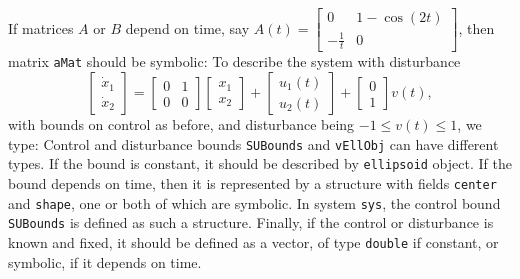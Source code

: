 If matrices $A$ or $B$ depend on time, say $A(t)=\left[\begin{array}{cc}
0 & 1-\cos(2t)\\
-\frac{1}{t} & 0\end{array}\right]$, then matrix {\tt aMat} should be symbolic:
To describe the system with disturbance
\[ \left[\begin{array}{cc}
\dot{x}_1\\
\dot{x}_2\end{array}\right] = \left[\begin{array}{cc}
0 & 1\\
0 & 0\end{array}\right]\left[\begin{array}{c}
x_1\\
x_2\end{array}\right] + \left[\begin{array}{c}
u_1(t)\\
u_2(t)\end{array}\right] + \left[\begin{array}{c}
0\\
1\end{array}\right]v(t), \]
with bounds on control as before, and disturbance being $-1\leq v(t)\leq1$,
we type:
Control and disturbance bounds {\tt SUBounds} and {\tt vEllObj} can have different types.
If the bound is constant, it should be described by {\tt ellipsoid} object.
If the bound depends on time, then it is represented by a structure with
fields {\tt center} and {\tt shape}, one or both of which are symbolic.
In system {\tt sys}, the control bound {\tt SUBounds} is defined as such a structure.
Finally, if the control or disturbance is known and fixed, it should be
defined as a vector, of type {\tt double} if constant, or symbolic, if
it depends on time.

